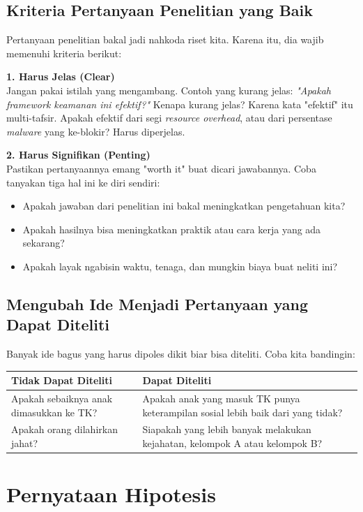 \documentclass[12pt,a4paper]{article}
\begin{document}
\subsection{Kriteria Pertanyaan Penelitian yang Baik} 
Pertanyaan penelitian bakal jadi nahkoda riset kita. Karena itu, dia wajib memenuhi kriteria berikut:

\textbf{1. Harus Jelas (Clear)} \\
Jangan pakai istilah yang mengambang. 
Contoh yang kurang jelas: \textit{"Apakah \textit{framework} keamanan ini efektif?"}
Kenapa kurang jelas? Karena kata "efektif" itu multi-tafsir. Apakah efektif dari segi \textit{resource overhead}, atau dari persentase \textit{malware} yang ke-blokir? Harus diperjelas.

\textbf{2. Harus Signifikan (Penting)} \\
Pastikan pertanyaannya emang "worth it" buat dicari jawabannya. Coba tanyakan tiga hal ini ke diri sendiri:
\begin{itemize}
    \item Apakah jawaban dari penelitian ini bakal meningkatkan pengetahuan kita?
    \item Apakah hasilnya bisa meningkatkan praktik atau cara kerja yang ada sekarang?
    \item Apakah layak ngabisin waktu, tenaga, dan mungkin biaya buat neliti ini?
\end{itemize}

\subsection{Mengubah Ide Menjadi Pertanyaan yang Dapat Diteliti}
Banyak ide bagus yang harus dipoles dikit biar bisa diteliti. Coba kita bandingin:
\begin{table}[h]
\centering
\begin{tabular}{@{}p{6cm}p{8cm}@{}}
\toprule
\textbf{Tidak Dapat Diteliti} & \textbf{Dapat Diteliti} \\ \midrule
Apakah sebaiknya anak dimasukkan ke TK? & Apakah anak yang masuk TK punya keterampilan sosial lebih baik dari yang tidak? \\ \addlinespace
Apakah orang dilahirkan jahat? & Siapakah yang lebih banyak melakukan kejahatan, kelompok A atau kelompok B? \\ \bottomrule
\end{tabular}
\end{table}

\newpage
\section{Pernyataan Hipotesis} 
\end{document}
